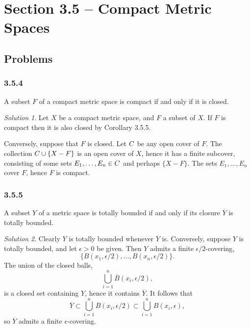 \documentclass{report}
\let\sc\relax
\newcommand{\sc}[1]{\mathscr{#1}}
\theoremstyle{remark}
\newtheorem*{solution}{Solution}
\begin{document}
\section*{Section 3.5 -- Compact Metric Spaces}

\subsection*{Problems}

\subsubsection*{3.5.4}
A subset $F$ of a compact metric space is compact if and only if it is closed.

\begin{solution}
  Let $X$ be a compact metric space, and $F$ a subset of $X$. If $F$ is compact then it is also closed by Corollary 3.5.5.

  Conversely, suppose that $F$ is closed. Let $\sc C$ be any open cover of $F$. The collection $\sc C \cup \{X - F\}$ is an open cover of $X$, hence it has a finite subcover, consisting of some sets $E_1, \dots, E_n \in \sc C$ and perhaps $\{X - F\}$. The sets $E_1, \dots, E_n$ cover $F$, hence $F$ is compact.
\end{solution}

\subsubsection*{3.5.5}
A subset $Y$ of a metric space is totally bounded if and only if its closure $\overline Y$ is totally bounded.

\begin{solution}
  Clearly $Y$ is totally bounded whenever $\overline Y$ is. Conversely, suppose $Y$ is totally bounded, and let $\epsilon > 0$ be given. Then $Y$ admits a finite $\epsilon/2$-covering,
  \begin{equation*}
    \{B(x_1, \epsilon/2), \dots, B(x_n, \epsilon/2)\}.
  \end{equation*}
  The union of the closed balls,
  \begin{equation*}
    \bigcup_{i=1}^n \overline B(x_i, \epsilon/2),
  \end{equation*}
  is a closed set containing $Y$, hence it contains $\overline Y$. It follows that
  \begin{equation*}
    \overline Y \subset \bigcup_{i=1}^n \overline B(x_i, \epsilon/2) \subset \bigcup_{i=1}^n B(x_i, \epsilon),
  \end{equation*}
  so $\overline Y$ admits a finite $\epsilon$-covering.
\end{solution}
\end{document}
